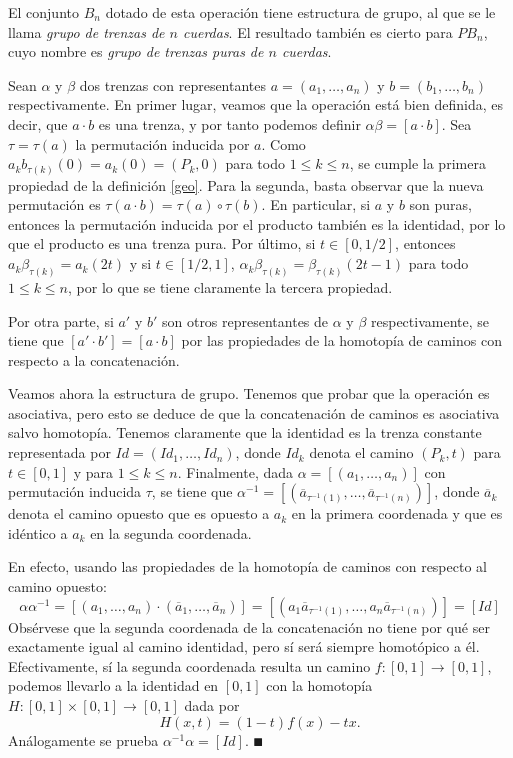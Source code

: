 \documentclass[TFG.tex]{subfiles}
\begin{document}
\begin{prop}
El conjunto $B_n$ dotado de esta operación tiene estructura de grupo, al que se le llama \emph{grupo de trenzas de $n$ cuerdas}. El resultado también es cierto para $PB_n$, cuyo nombre es \emph{grupo de trenzas puras de $n$ cuerdas}. 
\end{prop}

\begin{dem}
Sean $\alpha$ y $\beta$ dos trenzas con representantes $a=(a_1,\dots, a_n)$ y $b=(b_1,\dots, b_n)$ respectivamente. En primer lugar, veamos que la operación está bien definida, es decir, que $a\cdot b$ es una trenza, y por tanto podemos definir $\alpha\beta=[a\cdot b]$. Sea $\tau=\tau(a)$ la permutación inducida por $a$. Como $a_kb_{\tau(k)}(0)=a_k(0)=(P_k,0)$ para todo $1\leq k\leq n$, se cumple la primera propiedad de la definición \ref{geo}. Para la segunda, basta observar que la nueva permutación es $\tau(a\cdot b)=\tau(a)\circ \tau(b)$. En particular, si $a$ y $b$ son puras, entonces la permutación inducida por el producto también es la identidad, por lo que el producto es una trenza pura. Por último, si $t\in[0,1/2]$, entonces $a_k\beta_{\tau(k)}=a_k(2t)$ y si $t\in [1/2,1]$, $\alpha_k\beta_{\tau(k)}=\beta_{\tau(k)}(2t-1)$ para todo $1\leq k\leq n$, por lo que se tiene claramente la tercera propiedad. 

Por otra parte, si $a'$ y $b'$ son otros representantes de $\alpha$ y $\beta$ respectivamente, se tiene que $[a'\cdot b']=[a\cdot b]$ por las propiedades de la homotopía de caminos con respecto a la concatenación.

Veamos ahora la estructura de grupo. Tenemos que probar que la operación es asociativa, pero esto se deduce de que la concatenación de caminos es asociativa salvo homotopía.
Tenemos claramente que la identidad es la trenza constante representada por $Id=(Id_1,\dots, Id_n)$, donde $Id_k$ denota el camino $(P_k, t)$ para $t\in[0,1]$ y para $1\leq k\leq n$.
Finalmente, dada $\alpha=[(a_1,\dots, a_n)]$ con permutación inducida $\tau$, se tiene que $\alpha^{-1}=[(\overline{a}_{\tau^{-1}(1)},\dots, \overline{a}_{\tau^{-1}(n)})]$, donde $\overline{a}_k$ denota el camino opuesto que es opuesto a $a_k$ en la primera coordenada y que es idéntico a $a_k$ en la segunda coordenada. 

En efecto, usando las propiedades de la homotopía de caminos con respecto al camino opuesto:
\[
\alpha\alpha^{-1}=[(a_1,\dots, a_n)\cdot (\overline{a}_1,\dots, \overline{a}_n)]=[(a_1\overline{a}_{\tau^{-1}(1)},\dots, a_n\overline{a}_{\tau^{-1}(n)})]=[Id]
\]
Obsérvese que la segunda coordenada de la concatenación no tiene por qué ser exactamente igual al camino identidad, pero sí será siempre homotópico a él. Efectivamente, sí la segunda coordenada resulta un camino $f:[0,1]\to [0,1]$, podemos llevarlo a la identidad en $[0,1]$ con la homotopía $H:[0,1]\times[0,1]\to [0,1]$ dada por
\[
H(x,t)=(1-t)f(x)-tx.
\]
Análogamente se prueba $\alpha^{-1}\alpha=[Id]$. 
$\QED$
\end{dem}
\end{document}
